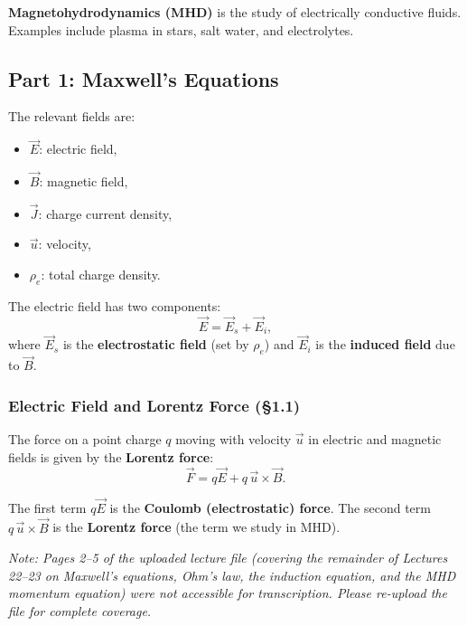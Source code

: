 \documentclass[11pt,a4paper]{article}
\newcommand{\uv}{\vec{u}}
\begin{document}
\textbf{Magnetohydrodynamics (MHD)} is the study of electrically conductive fluids. Examples include plasma in stars, salt water, and electrolytes.

\subsection{Part 1: Maxwell's Equations}

The relevant fields are:
\begin{itemize}[nosep]
    \item $\vec{E}$: electric field,
    \item $\vec{B}$: magnetic field,
    \item $\vec{J}$: charge current density,
    \item $\uv$: velocity,
    \item $\rho_e$: total charge density.
\end{itemize}

The electric field has two components:
\[
    \vec{E} = \vec{E}_s + \vec{E}_i,
\]
where $\vec{E}_s$ is the \textbf{electrostatic field} (set by $\rho_e$) and $\vec{E}_i$ is the \textbf{induced field} due to $\vec{B}$.

\subsubsection{Electric Field and Lorentz Force (\S1.1)}

The force on a point charge $q$ moving with velocity $\uv$ in electric and magnetic fields is given by the \textbf{Lorentz force}:
\[
    \boxed{\vec{F} = q\vec{E} + q\,\uv \times \vec{B}.}
\]

The first term $q\vec{E}$ is the \textbf{Coulomb (electrostatic) force}. The second term $q\,\uv \times \vec{B}$ is the \textbf{Lorentz force} (the term we study in MHD).

\bigskip
\textit{Note: Pages 2--5 of the uploaded lecture file (covering the remainder of Lectures 22--23 on Maxwell's equations, Ohm's law, the induction equation, and the MHD momentum equation) were not accessible for transcription. Please re-upload the file for complete coverage.}
\end{document}
